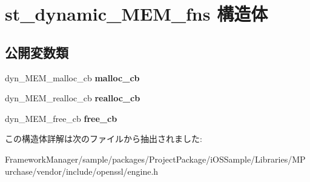 \hypertarget{structst__dynamic___m_e_m__fns}{}\section{st\+\_\+dynamic\+\_\+\+M\+E\+M\+\_\+fns 構造体}
\label{structst__dynamic___m_e_m__fns}
\subsection*{公開変数類}
\begin{DoxyCompactItemize}
\item 
\hypertarget{structst__dynamic___m_e_m__fns_af75222a0702aedaf6a9d1156ef9784ed}{}dyn\+\_\+\+M\+E\+M\+\_\+malloc\+\_\+cb {\bfseries malloc\+\_\+cb}\label{structst__dynamic___m_e_m__fns_af75222a0702aedaf6a9d1156ef9784ed}

\item 
\hypertarget{structst__dynamic___m_e_m__fns_a40fb5719d28a6c452821f0cb0eca231a}{}dyn\+\_\+\+M\+E\+M\+\_\+realloc\+\_\+cb {\bfseries realloc\+\_\+cb}\label{structst__dynamic___m_e_m__fns_a40fb5719d28a6c452821f0cb0eca231a}

\item 
\hypertarget{structst__dynamic___m_e_m__fns_aa6b8fe1b3872985cac1a62edacc1e983}{}dyn\+\_\+\+M\+E\+M\+\_\+free\+\_\+cb {\bfseries free\+\_\+cb}\label{structst__dynamic___m_e_m__fns_aa6b8fe1b3872985cac1a62edacc1e983}

\end{DoxyCompactItemize}


この構造体詳解は次のファイルから抽出されました\+:\begin{DoxyCompactItemize}
\item 
Framework\+Manager/sample/packages/\+Project\+Package/i\+O\+S\+Sample/\+Libraries/\+M\+Purchase/vendor/include/openssl/engine.\+h\end{DoxyCompactItemize}
